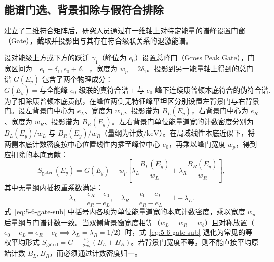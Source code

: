 \subsection{能谱门选、背景扣除与假符合排除}\label{subsec:5-6-4}

建立了二维符合矩阵后，研究人员通过在一维轴上对特定能量的谱峰设置门窗（Gate），截取并投影出与其存在符合级联关系的退激能谱。

设对能级上方或下方的跃迁 $\gamma_1$（峰位为 $e_0$）设置总峰门（Gross Peak Gate），门宽区间为 $[e_0 - \delta_1, e_0 + \delta_1]$，宽度为 $w_p = 2\delta_1$。投影到另一能量轴上得到的总门谱 $G(E_y)$ 包含了两个物理成分：
$$
G(E_y) = \text{与全能峰 } e_0 \text{ 级联的真符合谱} + \text{与 } e_0 \text{ 峰下连续康普顿本底符合的伪符合谱}.
$$
为了扣除康普顿本底贡献，在峰位两侧无特征峰平坦区分别设置左背景门与右背景门。设左背景门中心为 $e_L$、宽度为 $w_L$、投影谱为 $B_L(E_y)$，右背景门中心为 $e_R$、宽度为 $w_R$、投影谱为 $B_R(E_y)$。左右背景门单位能量道宽的计数密度分别为 $B_L(E_y)/w_L$ 与 $B_R(E_y)/w_R$（量纲为计数$/\mathrm{keV}$）。在局域线性本底近似下，将两侧本底计数密度按中心位置线性内插至峰位中心 $e_0$，再乘以峰门宽度 $w_p$，得到应扣除的本底贡献：
\begin{equation}\label{eq:5-6-gate-sub}
S_{\mathrm{gated}}(E_y) = G(E_y) - w_p \left[ \lambda_L \frac{B_L(E_y)}{w_L} + \lambda_R \frac{B_R(E_y)}{w_R} \right],
\end{equation}
其中无量纲内插权重系数满足：
\begin{equation}\label{eq:5-6-gate-weights}
\lambda_L = \frac{e_R - e_0}{e_R - e_L}, \quad \lambda_R = \frac{e_0 - e_L}{e_R - e_L} = 1 - \lambda_L.
\end{equation}
式~\eqref{eq:5-6-gate-sub} 中括号内各项为单位能量道宽的本底计数密度，乘以宽度 $w_p$ 后量纲与门谱计数一致。当双侧背景窗宽度相等（$w_L = w_R = w_b$）且对称放置（$e_0 - e_L = e_R - e_0 \implies \lambda_L = \lambda_R = 1/2$）时，式~\eqref{eq:5-6-gate-sub} 退化为常见的等权平均形式 $S_{\mathrm{gated}} = G - \frac{w_p}{2 w_b}(B_L + B_R)$。若背景门宽度不等，则不能直接平均原始计数 $B_L, B_R$，而必须通过计数密度归一。


